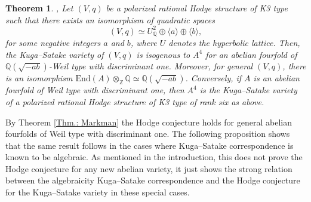 \documentclass[11pt,twoside,a4paper]{amsart}
\newcommand{\0}{\mathscr{O}}
\newcommand{\Q}{\mathbb{Q}}
\theoremstyle{plain}
\newtheorem{thm}{Theorem}[section]
\theoremstyle{definition}
\theoremstyle{remark}
\begin{document}
\begin{thm}\cite{lombardo01kugasatake},\cite[Thm.\ 9.2]{van2000kuga}
\label{thm: Lombardo KS and rank 6}
Let $(V,q)$ be a polarized rational Hodge structure of K3 type such that there exists an isomorphism of quadratic spaces 
\[
(V,q)\simeq U_\Q^2 \oplus \langle a \rangle \oplus \langle b \rangle,
\]
for some negative integers $a$ and $b$, where $U$ denotes the hyperbolic lattice. Then, the Kuga--Satake variety of $(V,q)$ is isogenous to $A^4$ for an abelian fourfold of $\Q(\sqrt{-ab})$-Weil type with discriminant one. Moreover, for general $(V,q)$, there is an isomorphism $\mathrm{End}(A)\otimes_\mathbb{Z}\Q\simeq \Q(\sqrt{-ab})$.
Conversely, if $A$ is an abelian fourfold of Weil type with discriminant one, then $A^4$ is the Kuga--Satake variety of a polarized rational Hodge structure of K3 type of rank six as above.
\end{thm}
By Theorem \ref{Thm.: Markman} the Hodge conjecture holds for general abelian fourfolds of Weil type with discriminant one. The following proposition shows that the same result follows in the cases where Kuga--Satake correspondence is known to be algebraic. As mentioned in the introduction, this does not prove the Hodge conjecture for any new abelian variety, it just shows the strong relation between the algebraicity Kuga--Satake correspondence and the Hodge conjecture for the Kuga--Satake variety in these special cases.
\end{document}
